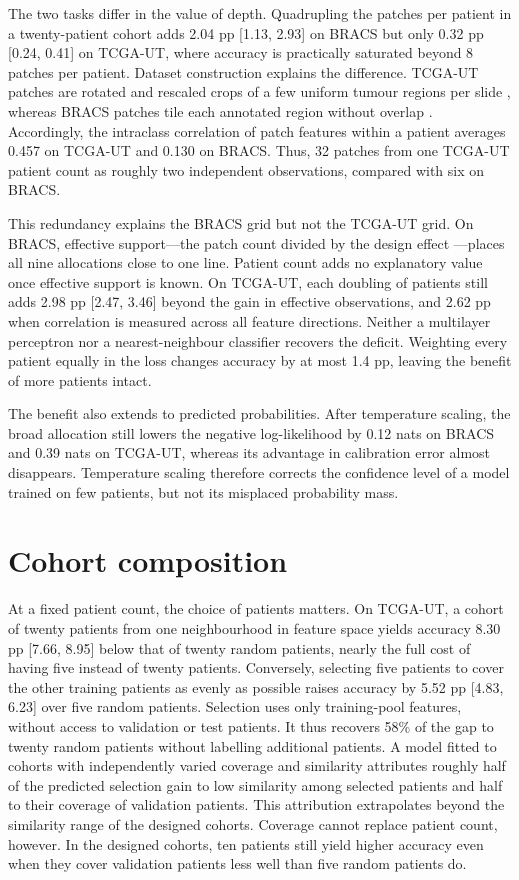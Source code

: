 \documentclass[11pt]{article}
\begin{document}
The two tasks differ in the value of depth. Quadrupling the patches per patient in a twenty-patient cohort adds 2.04 pp [1.13, 2.93] on BRACS but only 0.32 pp [0.24, 0.41] on TCGA-UT, where accuracy is practically saturated beyond 8 patches per patient. Dataset construction explains the difference. TCGA-UT patches are rotated and rescaled crops of a few uniform tumour regions per slide \citep{komura2022universalEncoding}, whereas BRACS patches tile each annotated region without overlap \citep{brancati2022bracs}. Accordingly, the intraclass correlation of patch features within a patient averages 0.457 on TCGA-UT and 0.130 on BRACS. Thus, 32 patches from one TCGA-UT patient count as roughly two independent observations, compared with six on BRACS.

This redundancy explains the BRACS grid but not the TCGA-UT grid. On BRACS, effective support---the patch count divided by the design effect \citep{kish1965survey}---places all nine allocations close to one line. Patient count adds no explanatory value once effective support is known. On TCGA-UT, each doubling of patients still adds 2.98 pp [2.47, 3.46] beyond the gain in effective observations, and 2.62 pp when correlation is measured across all feature directions. Neither a multilayer perceptron nor a nearest-neighbour classifier recovers the deficit. Weighting every patient equally in the loss changes accuracy by at most 1.4 pp, leaving the benefit of more patients intact.

The benefit also extends to predicted probabilities. After temperature scaling, the broad allocation still lowers the negative log-likelihood by 0.12 nats on BRACS and 0.39 nats on TCGA-UT, whereas its advantage in calibration error almost disappears. Temperature scaling therefore corrects the confidence level of a model trained on few patients, but not its misplaced probability mass.

\section{Cohort composition}
At a fixed patient count, the choice of patients matters. On TCGA-UT, a cohort of twenty patients from one neighbourhood in feature space yields accuracy 8.30 pp [7.66, 8.95] below that of twenty random patients, nearly the full cost of having five instead of twenty patients. Conversely, selecting five patients to cover the other training patients as evenly as possible raises accuracy by 5.52 pp [4.83, 6.23] over five random patients. Selection uses only training-pool features, without access to validation or test patients. It thus recovers 58\% of the gap to twenty random patients without labelling additional patients. A model fitted to cohorts with independently varied coverage and similarity attributes roughly half of the predicted selection gain to low similarity among selected patients and half to their coverage of validation patients. This attribution extrapolates beyond the similarity range of the designed cohorts. Coverage cannot replace patient count, however. In the designed cohorts, ten patients still yield higher accuracy even when they cover validation patients less well than five random patients do.
\end{document}
